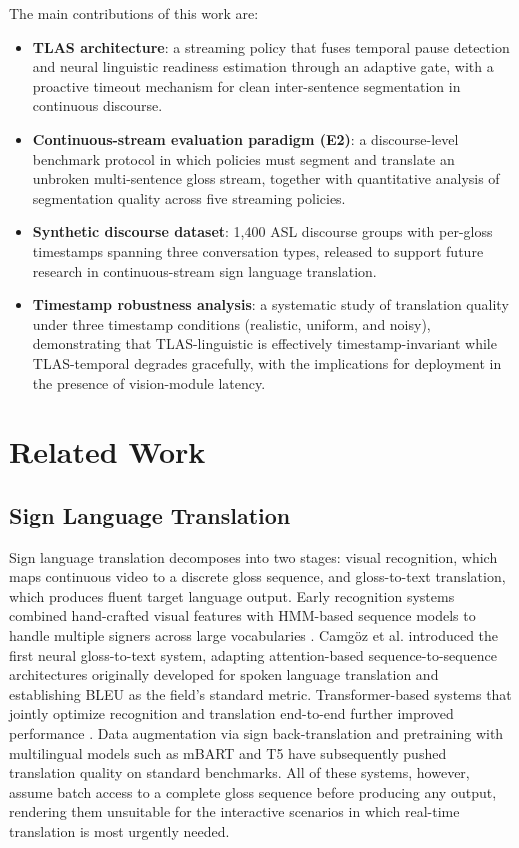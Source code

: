 \documentclass[conference]{IEEEtran}
\begin{document}
The main contributions of this work are:
\begin{itemize}
    \item \textbf{TLAS architecture}: a streaming policy that fuses temporal pause detection and neural linguistic readiness estimation through an adaptive gate, with a proactive timeout mechanism for clean inter-sentence segmentation in continuous discourse.
    \item \textbf{Continuous-stream evaluation paradigm (E2)}: a discourse-level benchmark protocol in which policies must segment and translate an unbroken multi-sentence gloss stream, together with quantitative analysis of segmentation quality across five streaming policies.
    \item \textbf{Synthetic discourse dataset}: 1,400 ASL discourse groups with per-gloss timestamps spanning three conversation types, released to support future research in continuous-stream sign language translation.
    \item \textbf{Timestamp robustness analysis}: a systematic study of translation quality under three timestamp conditions (realistic, uniform, and noisy), demonstrating that TLAS-linguistic is effectively timestamp-invariant while TLAS-temporal degrades gracefully, with the implications for deployment in the presence of vision-module latency.
\end{itemize}

\section{Related Work}

\subsection{Sign Language Translation}

Sign language translation decomposes into two stages: visual recognition, which maps continuous video to a discrete gloss sequence, and gloss-to-text translation, which produces fluent target language output. Early recognition systems combined hand-crafted visual features with HMM-based sequence models to handle multiple signers across large vocabularies \cite{koller2015continuous}. Camg{\"{o}}z et al. \cite{camgoz2018neural} introduced the first neural gloss-to-text system, adapting attention-based sequence-to-sequence architectures originally developed for spoken language translation and establishing BLEU as the field's standard metric. Transformer-based systems that jointly optimize recognition and translation end-to-end further improved performance \cite{camgoz2020sign}. Data augmentation via sign back-translation \cite{zhou2021improving} and pretraining with multilingual models such as mBART \cite{liu2020multilingual} and T5 \cite{raffel2020exploring} have subsequently pushed translation quality on standard benchmarks. All of these systems, however, assume batch access to a complete gloss sequence before producing any output, rendering them unsuitable for the interactive scenarios in which real-time translation is most urgently needed.
\end{document}
